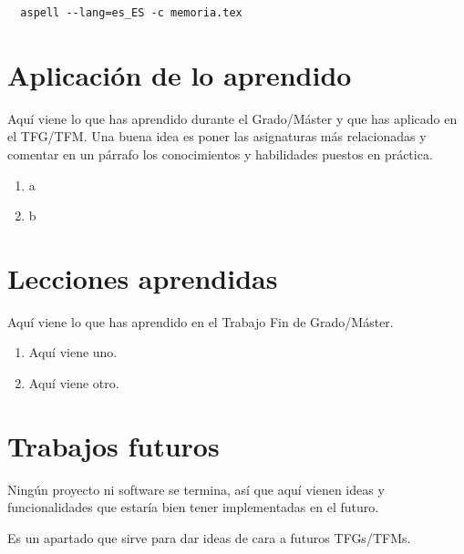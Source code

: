 \documentclass[a4paper, 12pt]{book}
\begin{document}
\begin{verbatim}
  aspell --lang=es_ES -c memoria.tex
\end{verbatim}

\section{Aplicación de lo aprendido}
\label{sec:aplicacion}

Aquí viene lo que has aprendido durante el Grado/Máster y que has aplicado en el TFG/TFM. Una buena idea es poner las asignaturas más relacionadas y comentar en un párrafo los conocimientos y habilidades puestos en práctica.

\begin{enumerate}
  \item a
  \item b
\end{enumerate}


\section{Lecciones aprendidas}
\label{sec:lecciones_aprendidas}

Aquí viene lo que has aprendido en el Trabajo Fin de Grado/Máster.

\begin{enumerate}
  \item Aquí viene uno.
  \item Aquí viene otro.
\end{enumerate}


\section{Trabajos futuros}
\label{sec:trabajos_futuros}

Ningún proyecto ni software se termina, así que aquí vienen ideas y funcionalidades que estaría bien tener implementadas en el futuro.

Es un apartado que sirve para dar ideas de cara a futuros TFGs/TFMs.


\glsaddall
\printglossary[type=\acronymtype]

\printglossary

\end{document}
